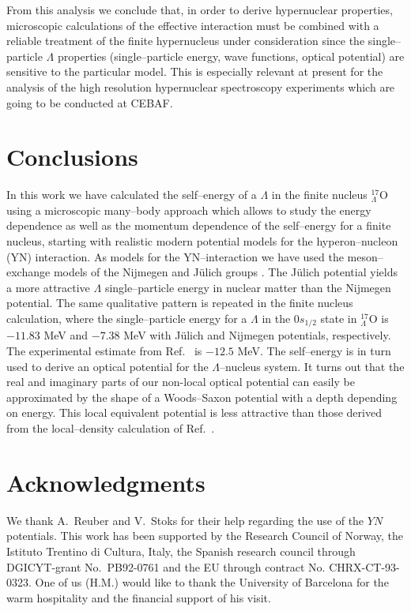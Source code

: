  From this analysis we conclude that, in order to derive hypernuclear
properties, microscopic calculations of
the effective interaction must be combined with a
reliable treatment of the finite hypernucleus under consideration
since
the single--particle $\Lambda$ properties (single--particle energy,
wave functions, optical potential) are sensitive to the particular
model. This is especially relevant at present for the analysis of
the high resolution
hypernuclear spectroscopy experiments which are going to be conducted
at CEBAF.



\section{Conclusions}

In this work we have calculated the self--energy of a
$\Lambda$ in the  finite nucleus $^{17}_{\Lambda}$O using
a microscopic many--body approach which allows to study
the energy dependence as well as the momentum dependence
of the self--energy for a finite nucleus, 
starting with realistic modern potential
models for the hyperon--nucleon (YN) interaction. As models 
for the YN--interaction we have used the meson--exchange 
models of the Nijmegen  \cite{nijmegen} and J\"ulich groups
 \cite{juelich}. The J\"ulich potential yields a more attractive
$\Lambda$ single--particle energy in nuclear matter than
the Nijmegen potential. The same qualitative pattern is repeated
in the finite nucleus calculation, where the single--particle 
energy for  a $\Lambda$ in the 
$0s_{1/2}$ state in  $^{17}_{\Lambda}$O is $-11.83$ MeV and 
$-7.38$ MeV with J\"ulich and Nijmegen potentials, respectively.
The experimental estimate from Ref.\  \cite{bando3} is
$-12.5$ MeV. 
The self--energy is in turn used to derive an optical potential
for the $\Lambda$--nucleus system. It turns out that the real and
imaginary parts of our 
non-local optical potential can easily be approximated by the 
shape of a Woods--Saxon potential with a depth depending on energy.
This local equivalent potential is less attractive than 
those derived from the local--density calculation of 
Ref.\  \cite{bando2}.  

\section{Acknowledgments}
We thank A.\ Reuber and V.\ Stoks for their help regarding the
use of the $YN$ potentials.
This work has been supported by the Research Council of Norway,
the Istituto Trentino di Cultura, Italy, 
the Spanish research council through DGICYT-grant No.\ PB92-0761
and the EU through contract No. CHRX-CT-93-0323. One of us (H.M.)
would like to thank the University of Barcelona for the warm hospitality
and the financial support of his visit.

